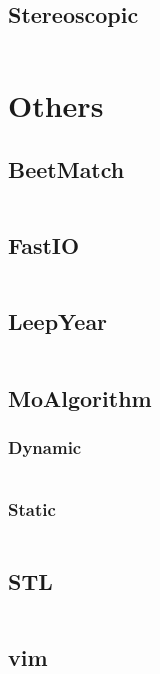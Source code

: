 \documentclass[a4paper,11pt]{article}
\begin{document}
\subsection{Stereoscopic}
\inputminted[breaklines]{c++}{06++Geometry/+Stereoscopic.cpp}

\newpage
\section{Others}
\subsection{BeetMatch}
\inputminted[breaklines]{c++}{07++Others/+BeetMatch.cpp}
\subsection{FastIO}
\inputminted[breaklines]{c++}{07++Others/+FastIO.cpp}
\subsection{LeepYear}
\inputminted[breaklines]{c++}{07++Others/+LeepYear.cpp}
\subsection{MoAlgorithm}
\subsubsection{Dynamic}
\inputminted[breaklines]{c++}{07++Others/+MoAlgorithm/+Dynamic.cpp}
\subsubsection{Static}
\inputminted[breaklines]{c++}{07++Others/+MoAlgorithm/+Static.cpp}

\subsection{STL}
\inputminted[breaklines]{c++}{07++Others/+STL.cpp}
\subsection{vim}
\inputminted[breaklines]{c++}{07++Others/+vim.vim}

\newpage
\end{document}
